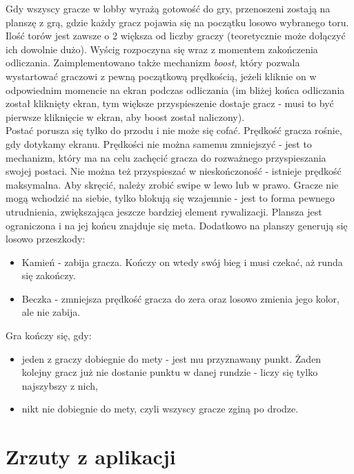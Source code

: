 \documentclass[]{report}
\begin{document}
Gdy wszyscy gracze w lobby wyrażą gotowość do gry, przenoszeni zostają na planszę z grą, gdzie każdy gracz pojawia się na początku losowo wybranego toru. Ilość torów jest zawsze o 2 większa od liczby graczy (teoretycznie może dołączyć ich dowolnie dużo).
Wyścig rozpoczyna się wraz z momentem zakończenia odliczania. Zaimplementowano także mechanizm \textit{boost}, który pozwala wystartować graczowi z pewną początkową prędkością, jeżeli kliknie on w odpowiednim momencie na ekran podczas odliczania (im bliżej końca odliczania został kliknięty ekran, tym większe przyspieszenie dostaje gracz - musi to być pierwsze kliknięcie w ekran, aby boost został naliczony).\\
Postać porusza się tylko do przodu i nie może się cofać. Prędkość gracza rośnie, gdy dotykamy ekranu. Prędkości nie można samemu zmniejszyć - jest to mechanizm, który ma na celu zachęcić gracza do rozważnego przyspieszania swojej postaci. Nie można też przyspieszać w nieskończoność - istnieje prędkość maksymalna. Aby skręcić, należy zrobić swipe w lewo lub w prawo. Gracze nie mogą wchodzić na siebie, tylko blokują się wzajemnie - jest to forma pewnego utrudnienia, zwiększająca jeszcze bardziej element rywalizacji. Plansza jest ograniczona i na jej końcu znajduje się meta. Dodatkowo na planszy generują się losowo przeszkody:
\begin{itemize}
	\item Kamień - zabija gracza. Kończy on wtedy swój bieg i musi czekać, aż runda się zakończy.
	\item Beczka - zmniejsza prędkość gracza do zera oraz losowo zmienia jego kolor, ale nie zabija.
\end{itemize}
Gra kończy się, gdy:
\begin{itemize}
	\item jeden z graczy dobiegnie do mety - jest mu przyznawany punkt. Żaden kolejny gracz już nie dostanie punktu w danej rundzie - liczy się tylko najszybszy z nich,
	\item nikt nie dobiegnie do mety, czyli wszyscy gracze zginą po drodze.
\end{itemize}
{\let\clearpage\relax \chapter*{Zrzuty z aplikacji}}
\end{document}
